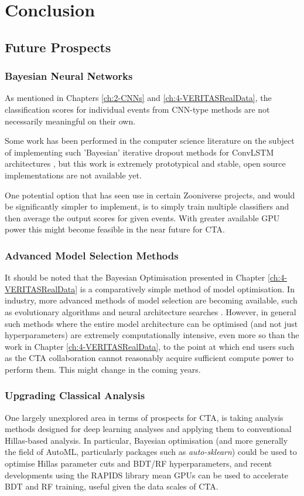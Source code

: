 \chapter{\label{ch6-Conclusions} Conclusion}
\minitoc
\section{Future Prospects}

\subsection{Bayesian Neural Networks}

As mentioned in Chapters \ref{ch:2-CNNs} and \ref{ch:4-VERITASRealData}, the classification scores for individual events from CNN-type methods are not necessarily meaningful on their own.

Some work has been performed in the computer science literature on the subject of implementing such 'Bayesian' iterative dropout methods for ConvLSTM architectures \cite{bayesconv},  but this work is extremely prototypical and stable, open source implementations are not available yet.

One potential option that has seen use in certain Zooniverse projects, and would be significantly simpler to implement, is to simply train multiple classifiers and then average the output scores for given events. With greater available GPU power this might become feasible in the near future for CTA.

\subsection{Advanced Model Selection Methods}

It should be noted that the Bayesian Optimisation presented in Chapter \ref{ch:4-VERITASRealData} is a comparatively simple method of model optimisation. In industry, more advanced methods of model selection are becoming available, such as evolutionary algorithms \cite{evodeep} and neural architecture searches \cite{neural}. However, in general such methods where the entire model architecture can be optimised (and not just hyperparameters) are extremely computationally intensive, even more so than the work in Chapter \ref{ch:4-VERITASRealData}, to the point at which end users such as the CTA collaboration cannot reasonably acquire sufficient compute power to perform them. This might change in the coming years.

\subsection{Upgrading Classical Analysis}
One largely unexplored area in terms of prospects for CTA, is taking analysis methods designed for deep learning analyses and applying them to conventional Hillas-based analysis. In particular, Bayesian optimisation (and more generally the field of AutoML, particularly packages such as \textit{auto-sklearn}\cite{autosklearn}) could be used to optimise Hillas parameter cuts and BDT/RF hyperparameters, and recent developments using the RAPIDS \cite{rapids} library mean GPUs can be used to accelerate BDT and RF training, useful given the data scales of CTA.


